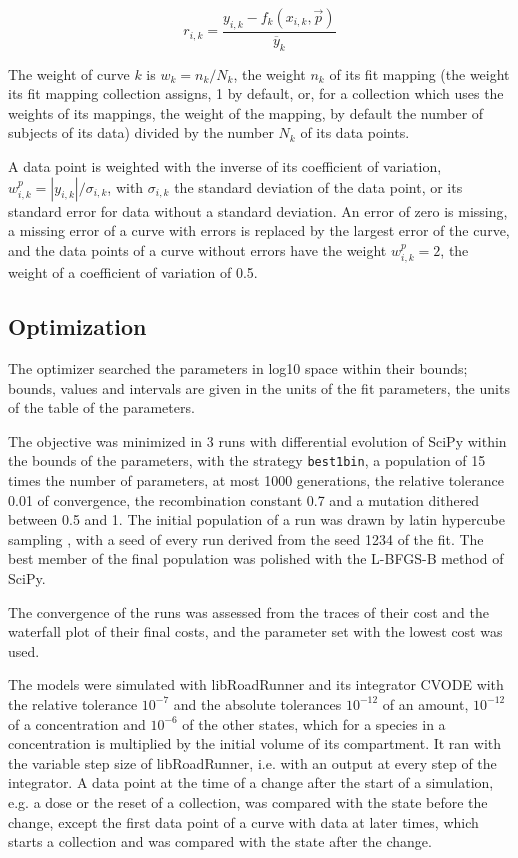 \begin{equation}
r_{i,k} = \frac{y_{i,k} - f_k(x_{i,k}, \vec{p})}{\overline{y}_k}
\end{equation}

The weight of curve $k$ is $w_k = n_k / N_k$, the weight $n_k$ of its fit mapping (the weight its fit mapping collection assigns, 1 by default, or, for a collection which uses the weights of its mappings, the weight of the mapping, by default the number of subjects of its data) divided by the number $N_k$ of its data points.

A data point is weighted with the inverse of its coefficient of variation, $w^{p}_{i,k} = |y_{i,k}| / \sigma_{i,k}$, with $\sigma_{i,k}$ the standard deviation of the data point, or its standard error for data without a standard deviation. An error of zero is missing, a missing error of a curve with errors is replaced by the largest error of the curve, and the data points of a curve without errors have the weight $w^{p}_{i,k} = 2$, the weight of a coefficient of variation of 0.5.

\subsection{Optimization}

The optimizer searched the parameters in log10 space within their bounds; bounds, values and intervals are given in the units of the fit parameters, the units of the table of the parameters.

The objective was minimized in 3 runs with differential evolution \cite{Storn1997} of SciPy \cite{Virtanen2020} within the bounds of the parameters, with the strategy \texttt{best1bin}, a population of 15 times the number of parameters, at most 1000 generations, the relative tolerance 0.01 of convergence, the recombination constant 0.7 and a mutation dithered between 0.5 and 1. The initial population of a run was drawn by latin hypercube sampling \cite{McKay1979}, with a seed of every run derived from the seed 1234 of the fit. The best member of the final population was polished with the L-BFGS-B method of SciPy.

The convergence of the runs was assessed from the traces of their cost and the waterfall plot of their final costs, and the parameter set with the lowest cost was used.

The models were simulated with libRoadRunner \cite{Welsh2023} and its integrator CVODE \cite{Hindmarsh2005} with the relative tolerance $10^{-7}$ and the absolute tolerances $10^{-12}$ of an amount, $10^{-12}$ of a concentration and $10^{-6}$ of the other states, which for a species in a concentration is multiplied by the initial volume of its compartment. It ran with the variable step size of libRoadRunner, i.e. with an output at every step of the integrator. A data point at the time of a change after the start of a simulation, e.g. a dose or the reset of a collection, was compared with the state before the change, except the first data point of a curve with data at later times, which starts a collection and was compared with the state after the change.

